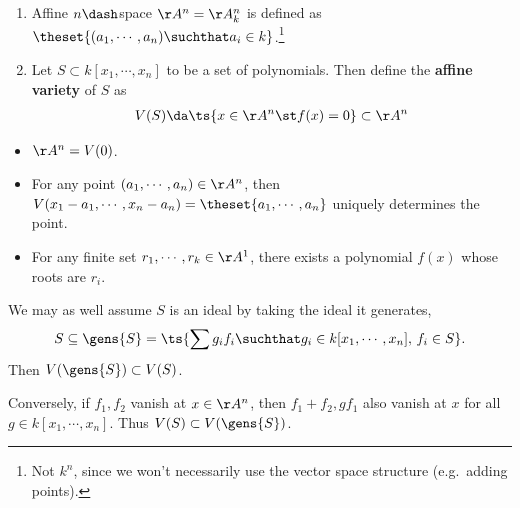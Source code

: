 \begin{definition}

\hfill

\begin{enumerate}
\def\labelenumi{\arabic{enumi}.}
\item
  Affine \(n\dash\)space \(\AA^n = \AA_k^n\) is defined as
  \(\theset{(a_1, \cdots, a_n) \suchthat a_i \in k}\).\footnote{Not
    \(k^n\), since we won't necessarily use the vector space structure
    (e.g.~adding points).}
\item
  Let \(S\subset k[x_1, \cdots, x_n]\) to be a set of polynomials. Then
  define the \textbf{affine variety} of \(S\) as
  \begin{align*}
    V(S) \da \ts{x\in \AA^n \st f(x) = 0} \subset \AA^n
    \end{align*}
\end{enumerate}

\end{definition}

\begin{example}

\hfill

\begin{itemize}
\tightlist
\item
  \(\AA^n = V(0)\).
\item
  For any point \((a_1, \cdots, a_n)\in \AA^n\), then
  \(V(x_1 - a_1, \cdots, x_n - a_n) = \theset{a_1, \cdots, a_n}\)
  uniquely determines the point.
\item
  For any finite set \(r_1, \cdots, r_k \in \AA^1\), there exists a
  polynomial \(f(x)\) whose roots are \(r_i\).
\end{itemize}

\end{example}

\begin{remark}

We may as well assume \(S\) is an ideal by taking the ideal it
generates,
\begin{align*}
S\subseteq \gens{S} = \ts{\sum g_i f_i \suchthat g_i \in k[x_1, \cdots, x_n],\, f_i\in S}
.\end{align*} Then \(V(\gens{S}) \subset V(S)\).

Conversely, if \(f_1, f_2\) vanish at \(x\in \AA^n\), then
\(f_1 + f_2, gf_1\) also vanish at \(x\) for all
\(g\in k[x_1, \cdots, x_n]\). Thus \(V(S) \subset V(\gens{S})\).

\end{remark}

